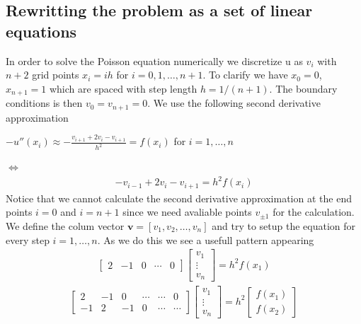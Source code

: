\documentclass[american,a4paper,12pt]{article}
\renewcommand{\vec}[1]{\mathbf{#1}} %
\begin{document}
  \subsection{Rewritting the problem as a set of linear equations}
    In order to solve the Poisson equation numerically we discretize u as $v_i$ with $n + 2$ grid points $x_i = ih$ for $i = 0, 1, \hdots, n + 1$. To clarify we have $x_0 = 0$, $x_{n+1} = 1$ which are spaced with step length $h = 1/(n + 1)$. The boundary conditions is then $v_0 = v_{n+1} = 0$. We use the following second derivative approximation
    \begin{center}
      $-u''(x_i) \approx -\frac{v_{i+1} + 2v_i - v_{i+1}}{h^2} =  f(x_i)$ \quad for $i = 1, \hdots, n$
    \end{center}
    $\Longleftrightarrow$
    \begin{align*}
      -v_{i-1} + 2v_i - v_{i+1} = h^2f(x_i)
    \end{align*}
    Notice that we cannot calculate the second derivative approximation at the end points $i = 0$ and $i = n + 1$ since we need avaliable points $v_{\pm 1}$ for the calculation. We define the colum vector $\vec{v} = [v_1, v_2, \hdots, v_n]$ and try to setup the equation for every step $i = 1, \hdots, n$. As we do this we see a usefull pattern appearing
    \begin{align*}
          \begin{bmatrix}
            2 & -1 & 0 & \cdots & 0
          \end{bmatrix}
          \begin{bmatrix}
            v_1 \\
            \vdots \\
            v_n
          \end{bmatrix}
    = h^2f(x_1)
    \end{align*}
    \begin{align*}
          \begin{bmatrix}
            2 & -1 & 0 & \cdots & \cdots & 0 \\
            -1 & 2 & -1 & 0 & \cdots & \cdots
          \end{bmatrix}
          \begin{bmatrix}
            v_1 \\
            \vdots \\
            v_n
          \end{bmatrix}
    = h^2
          \begin{bmatrix}
            f(x_1) \\
            f(x_2)
          \end{bmatrix}
    \end{align*}
\end{document}
